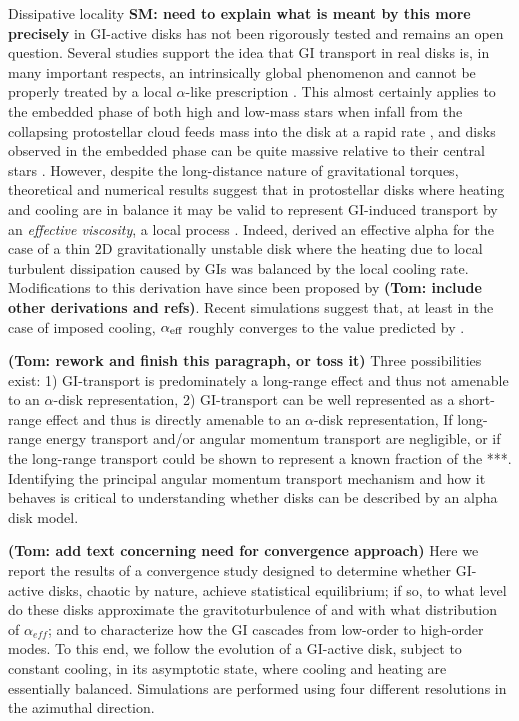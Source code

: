 \documentclass[manuscript]{aastex} %
\begin{document}
Dissipative locality {\bf SM: need to explain what is meant by this more precisely} in GI-active disks has not been rigorously tested and remains an open question. 
Several studies support the idea that GI transport in real disks is, in many important respects, an intrinsically global phenomenon and cannot be properly treated by a local $\alpha$-like prescription \citep{laughlin1996, balbus1999, lodato2005, mejia2005, boley2006, cai2008}.  This almost certainly applies to the embedded phase of both high and low-mass stars when infall from the collapsing protostellar cloud feeds mass into the disk at a rapid
rate \citep[e.g.]{yorke1993, laughlin1994, yorke1999,vorobyov2005,vorobyov2006}, and disks observed in the embedded phase can be quite massive relative to their central stars \citep[e.g.][]{osorio2003}. 
However, despite the long-distance nature of gravitational torques, theoretical and numerical results suggest that in protostellar disks where heating and cooling are in balance it may be valid to represent GI-induced transport by an {\it effective viscosity}, a local process \citep[e.g.][]{gammie2001, rice2005, lodato2004}. Indeed, \citet{gammie2001} derived an effective alpha for the case of a thin 2D gravitationally unstable disk where the heating due to local turbulent dissipation caused by GIs was balanced by the local cooling rate.  Modifications to this derivation have since been proposed by {\bf (Tom: include other derivations and refs)}.   Recent simulations \citep[e.g.]{cossins2009, vorobyov2010} suggest that, at least in the case of imposed cooling, $\alpha_{\rm{eff}}$ roughly converges to the value predicted by \citeauthor{gammie2001}. 

{\bf (Tom: rework and finish this paragraph, or toss it)}
Three possibilities exist: 1) GI-transport is predominately a long-range effect and thus not 
amenable to an $\alpha$-disk representation, 2) GI-transport can be well represented as
a short-range effect and thus is directly amenable to an $\alpha$-disk representation,
If long-range energy transport and/or angular momentum transport are negligible,  or if
the long-range transport could be shown to represent a known fraction of the 
***. 
Identifying the principal angular momentum transport mechanism
and how it behaves is critical to understanding whether disks can be described by an alpha disk model.

{\bf (Tom: add text concerning need for convergence approach)}
Here we report the results of a convergence study designed to determine whether GI-active disks, chaotic by nature, achieve statistical equilibrium; if so, to what level do these disks approximate the gravitoturbulence of \citet{gammie2001} and with what distribution of $\alpha_{eff}$; and to characterize how the GI cascades from low-order to high-order modes. To this end, we follow the evolution of a GI-active disk, subject to constant cooling, in its asymptotic state, where cooling and heating are essentially balanced.  Simulations are performed using four different resolutions in the azimuthal direction.
\end{document}
